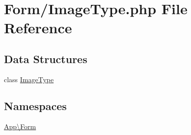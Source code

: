 \hypertarget{_image_type_8php}{}\section{Form/\+Image\+Type.php File Reference}
\label{_image_type_8php}
\subsection*{Data Structures}
\begin{DoxyCompactItemize}
\item 
class \mbox{\hyperlink{class_app_1_1_form_1_1_image_type}{Image\+Type}}
\end{DoxyCompactItemize}
\subsection*{Namespaces}
\begin{DoxyCompactItemize}
\item 
 \mbox{\hyperlink{namespace_app_1_1_form}{App\textbackslash{}\+Form}}
\end{DoxyCompactItemize}
